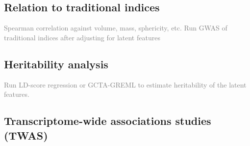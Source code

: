 \subsection*{Relation to traditional indices}
\textcolor{gray}{Spearman correlation against volume, mass, sphericity, etc. Run GWAS of traditional indices after adjusting for latent features}

\subsection*{Heritability analysis}
\textcolor{gray}{Run LD-score regression or GCTA-GREML to estimate heritability of the latent features.}

\subsection*{Transcriptome-wide associations studies (TWAS)}

